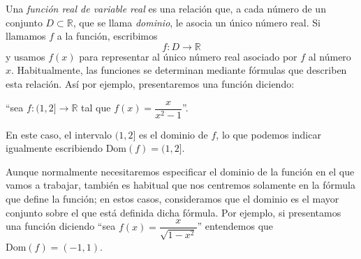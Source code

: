 Una \emph{función real de variable real} es una relación que, a cada número de un conjunto $D\subset\mathbb{R}$, que se llama \emph{dominio}, le asocia un único número real.
Si llamamos $f$ a la función, escribimos 
\[
f\colon D
\to\mathbb{R}
\]
y usamos $f(x)$ para representar al único número real asociado por $f$ al número~$x$.
Habitualmente, las funciones se determinan mediante fórmulas que describen esta relación. Así por ejemplo, presentaremos una función diciendo:
\begin{center}``sea $f\colon(1,2]\to\mathbb{R}$
tal que $f(x)=\dfrac{x}{x^2-1}$''.
\end{center}
En este caso, el intervalo $(1,2]$ es el dominio de $f$, lo que podemos indicar igualmente escribiendo $\mathrm{Dom}(f)=(1,2]$.

Aunque normalmente necesitaremos especificar el dominio de la función en el que vamos a trabajar, también es habitual que nos centremos solamente en la fórmula que define la función; en estos casos, consideramos que el dominio es el mayor conjunto sobre el que está definida dicha fórmula.
Por ejemplo, si presentamos una función diciendo ``sea $f(x)=\dfrac{x}{\sqrt{1-x^2}}$'' entendemos que $\mathrm{Dom}(f)=(-1,1)$.

